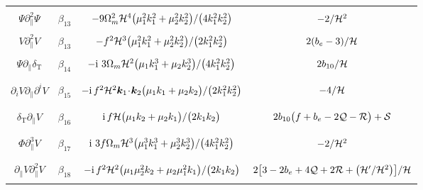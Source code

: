 \begin{landscape}
\begin{longtable}{| c | c | c | c |}
&  &  & \\
$\Psi\partial_{\parallel}^{2}\Psi $ & $\beta_{13}$ & $- {9}\Omega_{m}^2\mathcal{H}^{4}{\big(\mu_{1}^{2}k_{1}^{2} + \mu_{2}^{2}k_{2}^{2}\big)}/{\big(4k_{1}^{2}k_{2}^{2}\big)}$ & $-{2}/{\mathcal{H}^{2}}$  \\ 
&  &  & \\
$V\partial_{\parallel}^{2}V$ &$\beta_{13}$ & $-f^2\mathcal{H}^{3}{\big(\mu_{1}^{2}k_{1}^{2} + \mu_{2}^{2}k_{2}^{2}\big)}/{\big(2k_{1}^{2}k_{2}^{2}\big)}$ & ${2}(b_{e}-3)/{\mathcal{H}}$ \\ 
&  &  & \\
$\Psi\partial_{\parallel}\delta_{\mathrm{T}}$ &$\beta_{14}$ & $-{\mathrm{i\,}}\,3\Omega_{m}\mathcal{H}^2 {\big(\mu_{1}k_{1}^{3} + \mu_{2}k_{2}^{3}\big)}/{\big(4k_{1}^{2}k_{2}^{2}\big)}$& ${2}b_{10}/{\mathcal{H}}$ \\ 
&  &  & \\
\hline
&  &  & \\
$\partial_{i}V\partial_{\parallel}\partial^{i}V $ & $\beta_{15}$ &$ -\mathrm{i}\,f^2\mathcal{H}^2 \bm{k}_{1}\!\cdot\! \bm{k}_{2}{\big(\mu_{1}k_{1} + \mu_{2}k_{2}\big)}/{\big(2k_{1}^{2}k_{2}^{2}\big)}$ & $-{4}/{\mathcal{H}}$ \\ 
&  &  & \\
\hline 
&  &  & \\
${\delta_{\mathrm{T}}\partial_{\parallel}V}$ & $\beta_{16}$ & $\mathrm{i}\,f\mathcal{H}{\big(\mu_{1}k_{2} + \mu_{2}k_{1}\big)}/{\big(2k_{1}k_{2}\big)}$ & $2b_{10}\big(f+b_e-2\mathcal{Q}-\mathcal{R}\big)+{\mathcal{S}}$  \\ 
&  &  & \\
\hline
&  &  & \\ 
$\Phi\partial_{\parallel}^{3}V$ & $\beta_{17}$ & ${\mathrm{i\,}}\,3f\Omega_{m}\mathcal{H}^3 {\big(\mu_{1}^{3}k_{1}^{3} + \mu_{2}^{3}k_{2}^{3}\big)}/{\big(4k_{1}^{2}k_{2}^{2}\big)}$ & $-{2}/{\mathcal{H}^{2}}$ \\ 
&  &  & \\
\hline 
&  &  & \\
$\partial_{\parallel}V\partial^{2}_{\parallel}V$ & $\beta_{18}$ & $-\mathrm{i}\,f^{2}\mathcal{H}^2 {{\big(\mu_{1}\mu_{2}^{2}k_{2} +\mu_{2}\mu_{1}^{2}k_{1}\big) }/{\big(2k_{1}k_{2}\big)}}$ & ${2}\big[3-2b_{e}+{4}\mathcal{Q}+2{\cal R}+\big({\mathcal{H}'}/{\mathcal{H}^{2}}\big)\big]/{\mathcal{H}}$ \\ 
&  &  & \\

\end{longtable}
\end{landscape}

